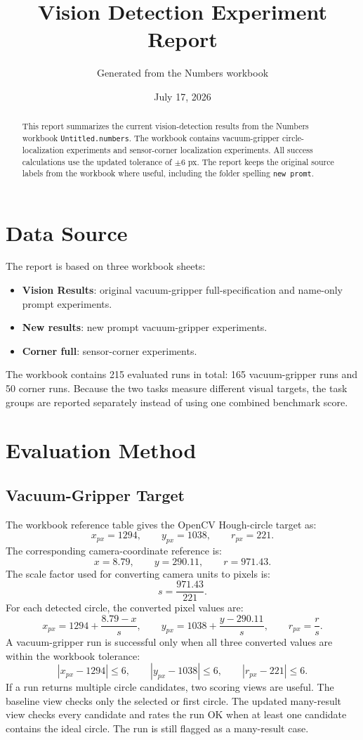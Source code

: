 \documentclass[11pt,a4paper]{article}
\title{Vision Detection Experiment Report}
\author{Generated from the Numbers workbook}
\date{July 17, 2026}
\begin{document}
\maketitle

\begin{abstract}
This report summarizes the current vision-detection results from the Numbers workbook \texttt{Untitled.numbers}. The workbook contains vacuum-gripper circle-localization experiments and sensor-corner localization experiments. All success calculations use the updated tolerance of \(\pm 6\) px. The report keeps the original source labels from the workbook where useful, including the folder spelling \texttt{new promt}.
\end{abstract}

\section{Data Source}

The report is based on three workbook sheets:

\begin{itemize}
  \item \textbf{Vision Results}: original vacuum-gripper full-specification and name-only prompt experiments.
  \item \textbf{New results}: new prompt vacuum-gripper experiments.
  \item \textbf{Corner full}: sensor-corner experiments.
\end{itemize}

The workbook contains 215 evaluated runs in total: 165 vacuum-gripper runs and 50 corner runs. Because the two tasks measure different visual targets, the task groups are reported separately instead of using one combined benchmark score.

\section{Evaluation Method}

\subsection{Vacuum-Gripper Target}

The workbook reference table gives the OpenCV Hough-circle target as:
\[
  x_{px}=1294,\qquad y_{px}=1038,\qquad r_{px}=221.
\]
The corresponding camera-coordinate reference is:
\[
  x=8.79,\qquad y=290.11,\qquad r=971.43.
\]
The scale factor used for converting camera units to pixels is:
\[
  s=\frac{971.43}{221}.
\]
For each detected circle, the converted pixel values are:
\[
  x_{px}=1294+\frac{8.79-x}{s},\qquad
  y_{px}=1038+\frac{y-290.11}{s},\qquad
  r_{px}=\frac{r}{s}.
\]
A vacuum-gripper run is successful only when all three converted values are within the workbook tolerance:
\[
  |x_{px}-1294| \leq 6,\qquad
  |y_{px}-1038| \leq 6,\qquad
  |r_{px}-221| \leq 6.
\]
If a run returns multiple circle candidates, two scoring views are useful. The baseline view checks only the selected or first circle. The updated many-result view checks every candidate and rates the run OK when at least one candidate contains the ideal circle. The run is still flagged as a many-result case.
\end{document}
